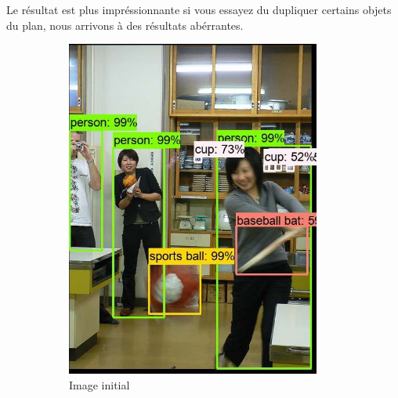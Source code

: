 \documentclass[12pt, letterpaper]{article}
\begin{document}
Le résultat est plus impréssionnante si vous essayez du dupliquer certains objets du plan, nous arrivons à des résultats abérrantes.
\begin{figure}[H]
    \centering
    \begin{subfigure}[b]{0.4\linewidth}
      \includegraphics[width=\linewidth]{img/fig17.png}
      \caption{Image initial}
    \end{subfigure}
    \begin{subfigure}[b]{0.4\linewidth}

\end{subfigure}
\end{figure}
\end{document}
